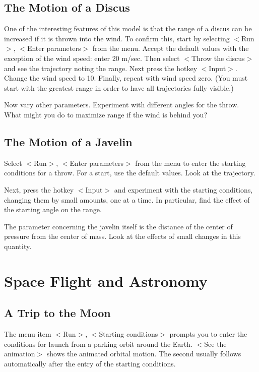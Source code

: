\subsection{The Motion of a Discus}

   One of the interesting features of this model is that the range
of a discus can be increased if it is thrown into the wind. To
confirm this, start by selecting $<$Run$>$, $<$Enter parameters$>$ from
the menu. Accept the default values with the exception of the
wind speed: enter 20 m/sec. Then select $<$Throw the discus$>$ and
see the trajectory noting the range. Next press the hotkey $<$Input$>$.
Change the  wind speed to 10. Finally, repeat with wind speed zero.
(You must start with the greatest range in order to have all
trajectories fully visible.)

   Now vary other parameters. Experiment with different angles for
the throw. What might you do to maximize range if the wind is behind you?


\subsection{The Motion of a Javelin}

   Select $<$Run$>$, $<$Enter parameters$>$ from the menu to enter the
starting conditions for a throw. For a start, use the default values.
Look at the trajectory.

   Next, press the hotkey $<$Input$>$ and experiment with the starting
conditions, changing them by small amounts, one at a time. In particular,
find the effect of the starting angle on the range.

   The parameter concerning the javelin itself is the distance of the
center of pressure from the center of mass. Look at the effects of
small changes in this quantity.



\section{Space Flight and Astronomy}


\subsection{A Trip to the Moon}

   The menu item $<$Run$>$, $<$Starting conditions$>$ prompts you to enter
the conditions for launch from a parking orbit around the Earth. $<$See
the animation$>$ shows the animated orbital motion. The second usually
follows automatically after the entry of the starting conditions.

